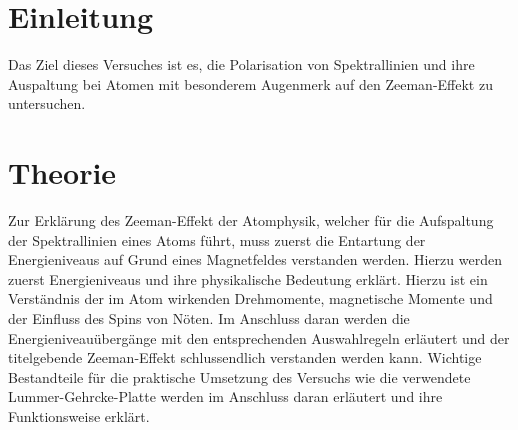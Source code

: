 \section{Einleitung}
Das Ziel dieses Versuches ist es, die Polarisation von Spektrallinien und ihre Auspaltung bei Atomen mit besonderem Augenmerk auf den Zeeman-Effekt zu untersuchen.

\section{Theorie}
Zur Erklärung des Zeeman-Effekt der Atomphysik, welcher für die Aufspaltung der Spektrallinien eines Atoms führt, muss zuerst die Entartung der Energieniveaus auf Grund eines Magnetfeldes verstanden werden. Hierzu werden zuerst Energieniveaus und ihre physikalische Bedeutung erklärt. Hierzu ist ein Verständnis der im Atom wirkenden Drehmomente, magnetische Momente und der Einfluss des Spins von Nöten. Im Anschluss daran werden die Energieniveauübergänge mit den entsprechenden Auswahlregeln erläutert und der titelgebende Zeeman-Effekt schlussendlich verstanden werden kann. 
Wichtige Bestandteile für die praktische Umsetzung des Versuchs wie die verwendete Lummer-Gehrcke-Platte werden im Anschluss daran erläutert und ihre Funktionsweise erklärt.

